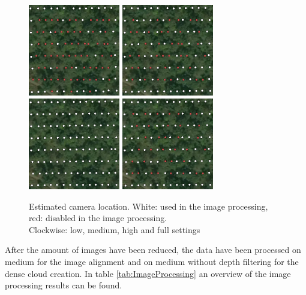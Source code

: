 \documentclass{isprs} %
\begin{document}
\begin{figure}[htp]
    \centering
    \includegraphics[width=4cm]{loc_low.png}
    \includegraphics[width=4cm]{loc_med.png}
    \includegraphics[width=4cm]{loc_full.png}
    \includegraphics[width=4cm]{loc_high.png}
    \caption{Estimated camera location. 
    White: used in the image processing, red: disabled in the image processing.\\
    Clockwise: low, medium, high and full settings}
    \label{fig:cameralocation}
\end{figure}

After the amount of images have been reduced, the data have been processed on medium for the image alignment and on medium without depth filtering for the dense cloud creation.
In table \ref{tab:ImageProcessing} an overview of the image processing results can be found.
\end{document}

